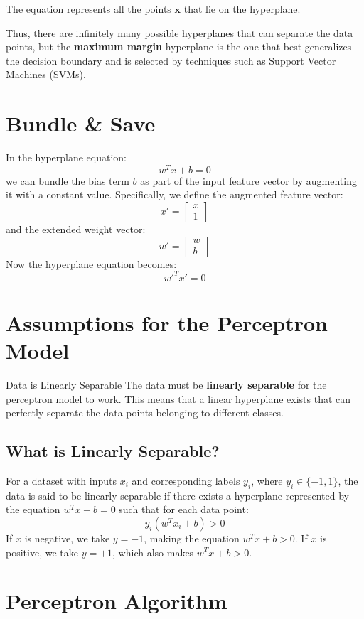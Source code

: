 The equation represents all the points \(\mathbf{x}\) that lie on the hyperplane.

Thus, there are infinitely many possible hyperplanes that can separate the data points, but the \textbf{maximum margin} hyperplane is the one that best generalizes the decision boundary and is selected by techniques such as Support Vector Machines (SVMs).
\section{Bundle \& Save}

In the hyperplane equation:
\[
w^T x + b = 0
\]
we can bundle the bias term \( b \) as part of the input feature vector by augmenting it with a constant value. Specifically, we define the augmented feature vector:
\[
x' = \begin{bmatrix} x \\ 1 \end{bmatrix}
\]
and the extended weight vector:
\[
w' = \begin{bmatrix} w \\ b \end{bmatrix}
\]
Now the hyperplane equation becomes:
\[
w'^T x' = 0
\]

\section{Assumptions for the Perceptron Model}

Data is Linearly Separable
The data must be \textbf{linearly separable} for the perceptron model to work. This means that a linear hyperplane exists that can perfectly separate the data points belonging to different classes. 

\subsection{What is Linearly Separable?}
For a dataset with inputs \( x_i \) and corresponding labels \( y_i \), where \( y_i \in \{-1, 1\} \), the data is said to be linearly separable if there exists a hyperplane represented by the equation \( w^T x + b = 0 \) such that for each data point:
\[
y_i (w^T x_i + b) > 0
\]
If \( x \) is negative, we take \( y = -1 \), making the equation \( w^T x + b > 0 \).  
If \( x \) is positive, we take \( y = +1 \), which also makes \( w^T x + b > 0 \).


\section{Perceptron Algorithm}

